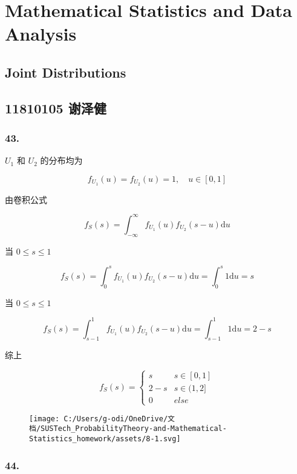 \documentclass[UTF8]{article}
\date{}
\begin{document}
\section{Mathematical Statistics and Data Analysis}\label{header-n0}

\subsection{Joint Distributions}\label{header-n2}

\subsection{11810105 谢泽健}\label{header-n3}

\subsubsection{43.}\label{header-n4}

\(U_1\) 和 \(U_2\) 的分布均为

\[f_{U_{1}}(u)=f_{U_{2}}(u)=1, \quad u \in[0,1]\]

由卷积公式

\[f_{S}(s)=\int_{-\infty}^{\infty} f_{U_1}(u) f_{U_2}(s-u) \mathrm{d} u\]

当 \(0\le s\le1\)

\[f_{S}(s)=\int_{0}^{s} f_{U_1}(u) f_{U_2}(s-u) \mathrm{d} u=\int_{0}^{s} 1 \mathrm{d} u=s\]

当 \(0\le s\le1\)

\[f_{S}(s)=\int_{s-1}^{1} f_{U_1}(u) f_{U_2}(s-u) \mathrm{d} u=\int_{s-1}^{1} 1 \mathrm{d} u=2-s\]

综上

\[f_{S}(s)=\left\{\begin{array}{ll}{s} & {s \in[0,1]} \\ 
{2-s} & {s \in(1,2]}
\\ 0 & else
\end{array}\right.\]

\begin{figure}
\centering
\texttt{[image: C:/Users/g-odi/OneDrive/文档/SUSTech\_ProbabilityTheory-and-Mathematical-Statistics\_homework/assets/8-1.svg]}
\caption{}
\end{figure}

\subsubsection{44.}\label{header-n16}
\end{document}
